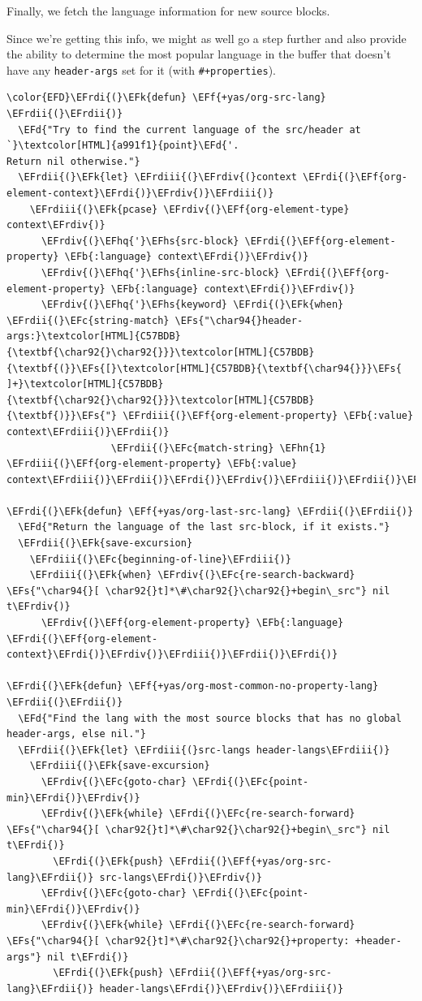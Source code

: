 \documentclass{scrartcl}
\newcommand{\EFk}[1]{\textcolor{EFk}{#1}} %
\newcommand{\EFd}[1]{\textcolor{EFd}{#1}} %
\newcommand{\EFs}[1]{\textcolor{EFs}{#1}} %
\newcommand{\EFb}[1]{\textcolor{EFb}{#1}} %
\newcommand{\EFc}[1]{\textcolor{EFc}{#1}} %
\newcommand{\EFf}[1]{\textcolor{EFf}{#1}} %
\newcommand{\EFhn}[1]{#1} %
\newcommand{\EFhq}[1]{#1} %
\newcommand{\EFhs}[1]{#1} %
\newcommand{\EFrdi}[1]{#1} %
\newcommand{\EFrdii}[1]{#1} %
\newcommand{\EFrdiii}[1]{#1} %
\newcommand{\EFrdiv}[1]{#1} %
\begin{document}
Finally, we fetch the language information for new source blocks.

Since we're getting this info, we might as well go a step further and also
provide the ability to determine the most popular language in the buffer that
doesn't have any \texttt{header-args} set for it (with \texttt{\#+properties}).

\begin{Code}
\begin{Verbatim}[]
\color{EFD}\EFrdi{(}\EFk{defun} \EFf{+yas/org-src-lang} \EFrdii{(}\EFrdii{)}
  \EFd{"Try to find the current language of the src/header at `}\textcolor[HTML]{a991f1}{point}\EFd{'.
Return nil otherwise."}
  \EFrdii{(}\EFk{let} \EFrdiii{(}\EFrdiv{(}context \EFrdi{(}\EFf{org-element-context}\EFrdi{)}\EFrdiv{)}\EFrdiii{)}
    \EFrdiii{(}\EFk{pcase} \EFrdiv{(}\EFf{org-element-type} context\EFrdiv{)}
      \EFrdiv{(}\EFhq{'}\EFhs{src-block} \EFrdi{(}\EFf{org-element-property} \EFb{:language} context\EFrdi{)}\EFrdiv{)}
      \EFrdiv{(}\EFhq{'}\EFhs{inline-src-block} \EFrdi{(}\EFf{org-element-property} \EFb{:language} context\EFrdi{)}\EFrdiv{)}
      \EFrdiv{(}\EFhq{'}\EFhs{keyword} \EFrdi{(}\EFk{when} \EFrdii{(}\EFc{string-match} \EFs{"\char94{}header-args:}\textcolor[HTML]{C57BDB}{\textbf{\char92{}\char92{}}}\textcolor[HTML]{C57BDB}{\textbf{(}}\EFs{[}\textcolor[HTML]{C57BDB}{\textbf{\char94{}}}\EFs{ ]+}\textcolor[HTML]{C57BDB}{\textbf{\char92{}\char92{}}}\textcolor[HTML]{C57BDB}{\textbf{)}}\EFs{"} \EFrdiii{(}\EFf{org-element-property} \EFb{:value} context\EFrdiii{)}\EFrdii{)}
                  \EFrdii{(}\EFc{match-string} \EFhn{1} \EFrdiii{(}\EFf{org-element-property} \EFb{:value} context\EFrdiii{)}\EFrdii{)}\EFrdi{)}\EFrdiv{)}\EFrdiii{)}\EFrdii{)}\EFrdi{)}

\EFrdi{(}\EFk{defun} \EFf{+yas/org-last-src-lang} \EFrdii{(}\EFrdii{)}
  \EFd{"Return the language of the last src-block, if it exists."}
  \EFrdii{(}\EFk{save-excursion}
    \EFrdiii{(}\EFc{beginning-of-line}\EFrdiii{)}
    \EFrdiii{(}\EFk{when} \EFrdiv{(}\EFc{re-search-backward} \EFs{"\char94{}[ \char92{}t]*\#\char92{}\char92{}+begin\_src"} nil t\EFrdiv{)}
      \EFrdiv{(}\EFf{org-element-property} \EFb{:language} \EFrdi{(}\EFf{org-element-context}\EFrdi{)}\EFrdiv{)}\EFrdiii{)}\EFrdii{)}\EFrdi{)}

\EFrdi{(}\EFk{defun} \EFf{+yas/org-most-common-no-property-lang} \EFrdii{(}\EFrdii{)}
  \EFd{"Find the lang with the most source blocks that has no global header-args, else nil."}
  \EFrdii{(}\EFk{let} \EFrdiii{(}src-langs header-langs\EFrdiii{)}
    \EFrdiii{(}\EFk{save-excursion}
      \EFrdiv{(}\EFc{goto-char} \EFrdi{(}\EFc{point-min}\EFrdi{)}\EFrdiv{)}
      \EFrdiv{(}\EFk{while} \EFrdi{(}\EFc{re-search-forward} \EFs{"\char94{}[ \char92{}t]*\#\char92{}\char92{}+begin\_src"} nil t\EFrdi{)}
        \EFrdi{(}\EFk{push} \EFrdii{(}\EFf{+yas/org-src-lang}\EFrdii{)} src-langs\EFrdi{)}\EFrdiv{)}
      \EFrdiv{(}\EFc{goto-char} \EFrdi{(}\EFc{point-min}\EFrdi{)}\EFrdiv{)}
      \EFrdiv{(}\EFk{while} \EFrdi{(}\EFc{re-search-forward} \EFs{"\char94{}[ \char92{}t]*\#\char92{}\char92{}+property: +header-args"} nil t\EFrdi{)}
        \EFrdi{(}\EFk{push} \EFrdii{(}\EFf{+yas/org-src-lang}\EFrdii{)} header-langs\EFrdi{)}\EFrdiv{)}\EFrdiii{)}


\end{Verbatim}
\end{Code}
\end{document}
